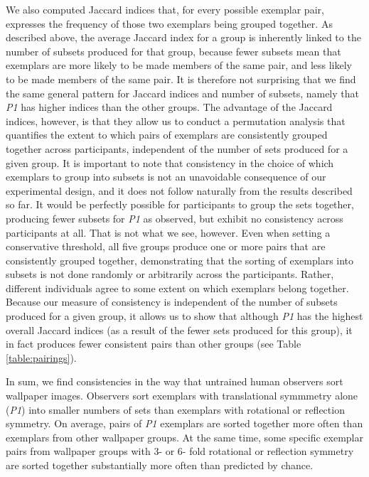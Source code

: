 \documentclass[11pt, twoside]{article}
\begin{document}
We also computed Jaccard indices that, for every possible exemplar pair, expresses the frequency of those two exemplars being grouped together. As described above, the average Jaccard index for a group is inherently linked to the number of subsets produced for that group, because fewer subsets mean that exemplars are more likely to be made members of the same pair, and less likely to be made members of the same pair. It is therefore not surprising that we find the same general pattern for Jaccard indices and number of subsets, namely that \textit{P1} has higher indices than the other groups. The advantage of the Jaccard indices, however, is that they allow us to conduct a permutation analysis that quantifies the extent to which pairs of exemplars are consistently grouped together across participants, independent of the number of sets produced for a given group. It is important to note that consistency in the choice of which exemplars to group into subsets is not an unavoidable consequence of our experimental design, and it does not follow naturally from the results described so far. It would be perfectly possible for participants to group the sets together, producing fewer subsets for \textit{P1} as observed, but exhibit no consistency across participants at all. That is not what we see, however. Even when setting a conservative threshold, all five groups produce one or more pairs that are consistently grouped together, demonstrating that the sorting of exemplars into subsets is not done randomly or arbitrarily across the participants. Rather, different individuals agree to some extent on which exemplars belong together. Because our measure of consistency is independent of the number of subsets produced for a given group, it allows us to show that although \textit{P1} has the highest overall Jaccard indices (as a result of the fewer sets produced for this group), it in fact produces fewer consistent pairs than other groups (see Table \ref{table:pairings}).

In sum, we find consistencies in the way that untrained human observers sort wallpaper images. Observers sort exemplars with translational symmmetry alone (\textit{P1}) into smaller numbers of sets than exemplars with rotational or reflection symmetry. On average, pairs of \textit{P1} exemplars are sorted together more often than exemplars from other wallpaper groups. At the same time, some specific exemplar pairs from wallpaper groups with 3- or 6- fold rotational or reflection symmetry are sorted together substantially more often than predicted by chance.
\end{document}
